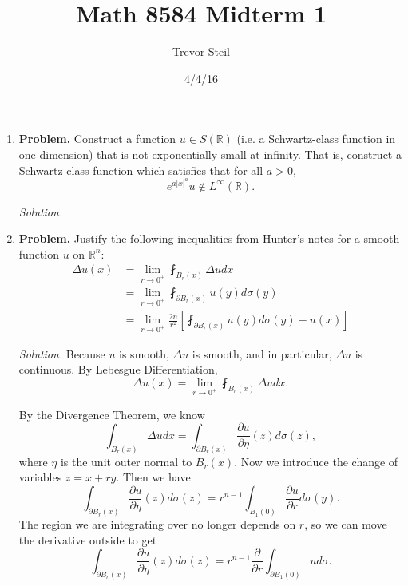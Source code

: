 \documentclass[a4paper]{article}
\title{Math 8584 Midterm 1 }
\date{4/4/16}
\author{Trevor Steil}
\newenvironment{solution}{\emph{Solution.}}{}
\newenvironment{problem}{\textbf{Problem.}}{}
\newcommand{\R}{\mathbb{R}}
\begin{document}
\maketitle

\begin{enumerate}
  \item
    \begin{problem}
      Construct a function $u \in S(\R)$ (i.e. a Schwartz-class function in one dimension) that is not exponentially small at infinity.
      That is, construct a Schwartz-class function which satisfies that for all $a > 0$,
      \[ e^{a |x|^a} u \not \in L^\infty(\R) .\]
    \end{problem}

    \begin{solution}
    \end{solution}

  \item
    \begin{problem}
      Justify the following inequalities from Hunter's notes for a smooth function $u$ on $\R^n$:
      \begin{align*}
        \Delta u(x) &= \lim_{r \to 0^+} \fint_{B_r(x)} \Delta u dx \\
        &= \lim_{r \to 0^+} \fint_{\partial B_r(x)}^{} u(y) d\sigma(y) \\
        &= \lim_{r \to 0^+} \frac{2n}{r^2} \left[ \fint_{\partial B_r(x)}^{} u(y) d\sigma(y) - u(x) \right]
      \end{align*}

    \end{problem}

    \begin{solution}
      Because $u$ is smooth, $\Delta u$ is smooth, and in particular, $\Delta u$ is continuous. By Lebesgue Differentiation,
      \[ \Delta u(x) = \lim_{r \to 0^+} \fint_{B_r(x)}^{} \Delta u dx .\]

      By the Divergence Theorem, we know
      \[ \int_{B_r(x)}^{} \Delta u dx = \int_{\partial B_r(x)}^{} \frac{\partial u}{\partial \eta}(z) d \sigma(z) ,\]
      where $\eta$ is the unit outer normal to $B_r(x)$. Now we introduce the change of variables $z = x+ry$. Then we have
      \[ \int_{\partial B_r(x)}^{} \frac{\partial u}{\partial \eta}(z) d \sigma(z) = r^{n-1} \int_{B_1(0)}^{} \frac{\partial u}{\partial r} d
      \sigma(y) .\]
      The region we are integrating over no longer depends on $r$, so we can move the derivative outside to get
      \[ \int_{\partial B_r(x)}^{} \frac{\partial u}{\partial \eta}(z) d \sigma(z) = r^{n-1} \frac{\partial}{\partial r} \int_{\partial B_1(0)}^{}
      u d \sigma .\]


\end{solution}
\end{enumerate}
\end{document}
